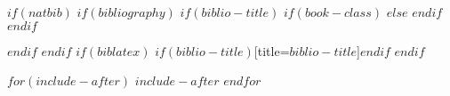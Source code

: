 \documentclass[$for(classoption)$$classoption$$sep$,$endfor$]{JASA}
\begin{document}







$if(natbib)$
$if(bibliography)$
$if(biblio-title)$
$if(book-class)$
\renewcommand\bibname{$biblio-title$}
$else$
\renewcommand\refname{$biblio-title$}
$endif$
$endif$

$endif$
$endif$
$if(biblatex)$
\printbibliography$if(biblio-title)$[title=$biblio-title$]$endif$
$endif$

$for(include-after)$
$include-after$
$endfor$
\end{document}

